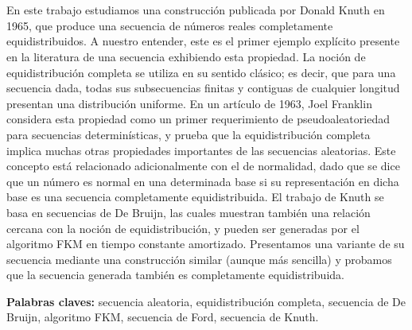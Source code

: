 \chapter*{\runtitulo}

\noindent En este trabajo estudiamos una construcción publicada por Donald Knuth en 1965, que produce una secuencia de números reales completamente equidistribuidos. A nuestro entender, este es el primer ejemplo explícito presente en la literatura de una secuencia exhibiendo esta propiedad. La noción de equidistribución completa se utiliza en su sentido clásico; es decir, que para una secuencia dada, todas sus subsecuencias finitas y contiguas de cualquier longitud presentan una distribución uniforme. En un artículo de 1963, Joel Franklin considera esta propiedad como un primer requerimiento de pseudoaleatoriedad para secuencias determinísticas, y prueba que la equidistribución completa implica muchas otras propiedades importantes de las secuencias aleatorias. Este concepto está relacionado adicionalmente con el de normalidad, dado que se dice que un número es normal en una determinada base si su representación en dicha base es una secuencia completamente equidistribuida. El trabajo de Knuth se basa en secuencias de De Bruijn, las cuales muestran también una relación cercana con la noción de equidistribución, y pueden ser generadas por el algoritmo FKM en tiempo constante amortizado. Presentamos una variante de su secuencia mediante una construcción similar (aunque más sencilla) y probamos que la secuencia generada también es completamente equidistribuida.

\bigskip

\noindent\textbf{Palabras claves:} secuencia aleatoria, equidistribución completa, secuencia de De Bruijn, algoritmo FKM, secuencia de Ford, secuencia de Knuth.